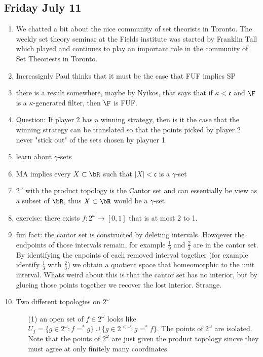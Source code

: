 \documentclass{article}
\begin{document}
\subsection*{Friday July 11}
\begin{enumerate}
    \item We chatted a bit about the nice community of set theorists in Toronto. The weekly set theory seminar at the Fields institute was started by Franklin Tall which played and continues to play an important role in the community of Set Theoriests in Toronto.
    \item Increasignly Paul thinks that it must be the case that FUF implies SP
    \item there is a result somewhere, maybe by Nyikos, that says that if \(\kappa < \mathfrak{c}\) and \(\F\) is a \(\kappa\)-generated filter, then \(\F\) is FUF.
    \item Question: If player 2 has a winning strategy, then is it the case that the winning strategy can be translated so that the points picked by player 2 never "stick out" of the sets chosen by playuer 1
    \item learn about \(\gamma\)-sets \checkmark
    \item MA implies every \(X \subset \bR\) such that \(|X| < \mathfrak{c}\) is a \(\gamma\)-set
    \item \(2^{\omega}\) with the product topology is the Cantor set and can essentially be view as a subset of \(\bR\), thus \(X \subset \bR\) would be a \(\gamma\)-set
    \item exercise: there exists \(f:2^{\omega} \to [0, 1]\) that is at most 2 to 1.
    \item fun fact: the cantor set is constructed by deleting intervals. Howqever the endpoints of those intervals remain, for example \(\frac{1}{9}\) and \(\frac{2}{3}\) are in the cantor set. By identifying the enpoints of each removed interval together (for example identify \(\frac{1}{3}\) with \(\frac{2}{3}\)) we obtain a quotient space that homeomorphic to the unit interval. Whats weird about this is that the cantor set has no interior, but by glueing those points together we recover the lost interior. Strange.
    \item Two different topologies on \(2^{\omega}\)
    \begin{itemize}
        \item[(1)] an open set of \(f \in 2^{\omega}\) looks like \(U_f = \{g \in 2^{\omega}: f=^{\ast}g\}\cup\{g \in 2^{<\omega} : g=^{\ast}f\} \). The points of \(2^{\omega}\) are isolated. Note that the points of \(2^{\omega}\) are just given the product topology sincve they must agree at only finitely many coordinates.

\end{itemize}
\end{enumerate}
\end{document}
